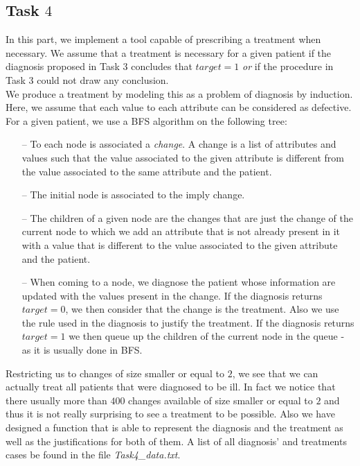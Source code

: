 \documentclass[9pt]{extarticle}
\begin{document}
\subsection{Task $4$}
	In this part, we implement a tool capable of prescribing a treatment when necessary. We assume that a treatment is necessary for a given patient if the diagnosis proposed in Task $3$ concludes that $target=1$ \emph{or} if the procedure in Task $3$ could not draw any conclusion.\\
	We produce a treatment by modeling this as a problem of diagnosis by induction. Here, we assume that each value to each attribute can be considered as defective. For a given patient, we use a BFS algorithm on the following tree:
	\begin{itemize}[topsep=0pt,itemsep=0pt,partopsep=0pt, parsep=0pt]
		\item[--] To each node is associated a \emph{change}. A change is a list of attributes and values such that the value associated to the given attribute is different from the value associated to the same attribute and the patient.
		\item[--] The initial node is associated to the imply change.
		\item[--] The children of a given node are the changes that are just the change of the current node to which we add an attribute that is not already present in it with a value that is different to the value associated to the given attribute and the patient.
		\item[--] When coming to a node, we diagnose the patient whose information are updated with the values present in the change. If the diagnosis returns $target=0$, we then consider that the change is the treatment. Also we use the rule used in the diagnosis to justify the treatment. If the diagnosis returns $target=1$ we then queue up the children of the current node in the queue - as it is usually done in BFS.
	\end{itemize}
Restricting us to changes of size smaller or equal to $2$, we see that we can actually treat all patients that were diagnosed to be ill. In fact we notice that there usually more than $400$ changes available of size smaller or equal to $2$ and thus it is not really surprising to see a treatment to be possible. Also we have designed a function that is able to represent the diagnosis and the treatment as well as the justifications for both of them. A list of all diagnosis' and treatments cases be found in the file \emph{Task4\_data.txt}.
\end{document}
